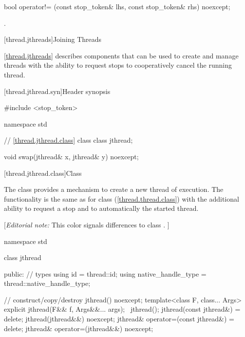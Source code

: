 {%
\begin{itemdecl}
bool operator!= (const stop_token& lhs, const stop_token& rhs) noexcept;
\end{itemdecl}
\begin{itemdescr}
  \pnum\returns {}.
\end{itemdescr}


\clearpage

[thread.jthreads]{Joining Threads}


\pnum
\ref{thread.jthreads} describes components that can be used to create and manage threads
with the ability to request stops to cooperatively cancel the running thread.

[thread.jthread.syn]{Header  synopsis}
%

\begin{codeblock}
#include <stop_token>

namespace std {
  // \ref{thread.jthread.class} class 
  class jthread;

  void swap(jthread& x, jthread& y) noexcept;
}
\end{codeblock}


[thread.jthread.class]{Class }

\pnum
The class  provides a mechanism
to create a new thread of execution.
The functionality is the same as for class  (\ref{thread.thread.class})
with the additional ability to request a stop and to
automatically  the started thread.

{\color{blue}
[{\itshape{}Editorial note:} {\color{diffcolor}This color signals differences to class .} ]
}

%
\begin{codeblock}
namespace std {
  class jthread {
  public:
    // types
    using id = thread::id;
    using native_handle_type = thread::native_handle_type;

    // construct/copy/destroy
    jthread() noexcept;
    template<class F, class... Args> explicit jthread(F&& f, Args&&... args);
    ~jthread();
    jthread(const jthread&) = delete;
    jthread(jthread&&) noexcept;
    jthread& operator=(const jthread&) = delete;
    jthread& operator=(jthread&&) noexcept;

}}
\end{codeblock}}

